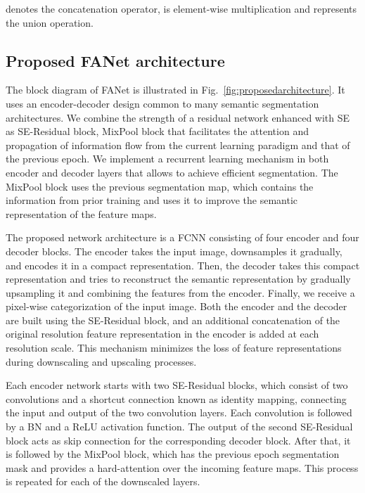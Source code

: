 \documentclass[journal]{IEEEtran}
\begin{document}
  denotes the concatenation operator,  is element-wise multiplication and  represents the union operation.

\subsection{Proposed FANet architecture}
\label{Proposedarchitecture}
The block diagram of FANet is illustrated in Fig.~\ref{fig:proposedarchitecture}. It uses an encoder-decoder design common to many semantic segmentation architectures. We combine the strength of a residual network enhanced with \ac{SE} as SE-Residual block, MixPool block that facilitates the attention and propagation of information flow from the current learning paradigm and that of the previous epoch. We implement a recurrent learning mechanism in both encoder and decoder layers that allows to achieve efficient segmentation. The MixPool block uses the previous segmentation map, which contains the information from prior training and uses it to improve the semantic representation of the feature maps.

The proposed network architecture is a \ac{FCNN} consisting of four encoder and four decoder blocks. The encoder takes the input image, downsamples it gradually, and encodes it in a compact representation. Then, the decoder takes this compact representation and tries to reconstruct the semantic representation by gradually upsampling it and combining the features from the encoder. Finally,  we receive a pixel-wise categorization of the input image. Both the encoder and the decoder are built using the SE-Residual block, and an additional concatenation of the original resolution feature representation in the encoder is added at each resolution scale. This mechanism minimizes the loss of feature representations during downscaling and upscaling processes. 

Each encoder network starts with two SE-Residual blocks, which consist of two  convolutions and a shortcut connection known as identity mapping, connecting the input and output of the two convolution layers. Each convolution is followed by a \ac{BN} and a \ac{ReLU} activation function. The output of the second SE-Residual block acts as skip connection for the corresponding decoder block. After that, it is followed by the MixPool block, which has the previous epoch segmentation mask and provides a hard-attention over the incoming feature maps. This process is repeated for each of the downscaled layers. 
\end{document}
